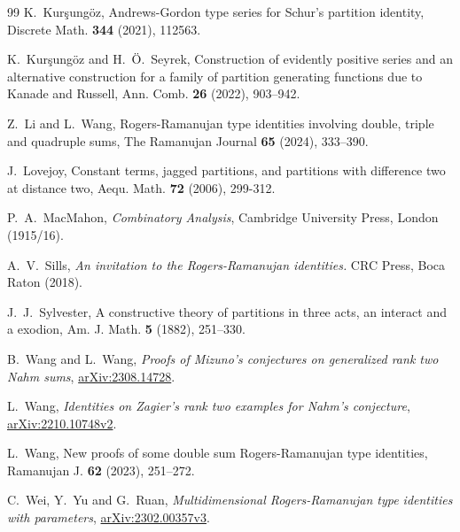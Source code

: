 \documentclass[11pt,reqno]{amsart}
\numberwithin{equation}{section}
\theoremstyle{plain}
\theoremstyle{definition}
\begin{document}
\begin{thebibliography}{99}
 K.~Kur\c{s}ung\"{o}z, Andrews-Gordon type series for Schur's partition identity, Discrete Math. {\bf 344} (2021), 112563.

 K.~Kur\c{s}ung\"{o}z and H.~\"O.~Seyrek, Construction of evidently positive series
and an alternative construction for a family of partition generating functions due to Kanade and Russell, Ann. Comb. {\bf 26} (2022), 903--942.

 Z.~Li and L.~Wang, Rogers-Ramanujan type identities involving double, triple and quadruple sums, The Ramanujan Journal {\bf 65} (2024), 333--390.

 J.~Lovejoy, Constant terms, jagged partitions, and partitions with difference two at distance two, Aequ. Math. {\bf 72} (2006), 299-312.

 P.~A.~MacMahon, {\it Combinatory Analysis}, Cambridge University Press, London (1915/16).



 A.~V.~Sills, {\it An invitation to the Rogers-Ramanujan identities.} CRC Press, Boca Raton (2018).



 J.~J.~Sylvester, A constructive theory of partitions in three acts, an interact and a exodion, Am. J. Math. {\bf 5} (1882), 251--330.

 B.~Wang and L.~Wang, {\it Proofs of Mizuno's conjectures on generalized rank two Nahm sums}, \href{https://arxiv.org/abs/2308.14728}{arXiv:2308.14728}.

 L.~Wang, {\it Identities on Zagier's rank two examples for Nahm's conjecture}, \href{https://arxiv.org/abs/2210.10748v2}{arXiv:2210.10748v2}.

 L.~Wang, New proofs of some double sum Rogers-Ramanujan type identities, Ramanujan J. {\bf62} (2023), 251--272.



 C.~Wei, Y.~Yu and G.~Ruan, {\it Multidimensional Rogers-Ramanujan type identities with parameters}, \href{https://arxiv.org/abs/2302.00357v3}{arXiv:2302.00357v3}.


\end{thebibliography}
\end{document}
